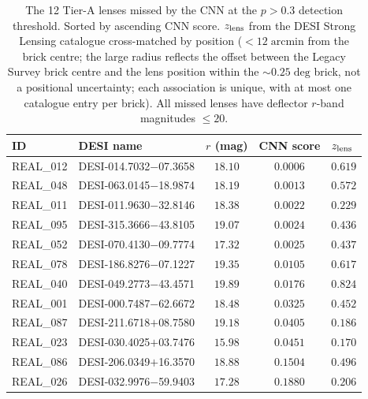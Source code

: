 \documentclass[fleqn,usenatbib]{mnras}
\begin{document}
\begin{table}
\centering
\caption{The 12 Tier-A lenses missed by the CNN at the $p > 0.3$ detection threshold.  Sorted by ascending CNN score.  $z_{\rm lens}$ from the DESI Strong Lensing catalogue cross-matched by position ($< 12\;\mathrm{arcmin}$ from the brick centre; the large radius reflects the offset between the Legacy Survey brick centre and the lens position within the $\sim\!0.25\;\mathrm{deg}$ brick, not a positional uncertainty; each association is unique, with at most one catalogue entry per brick).  All missed lenses have deflector $r$-band magnitudes $\leq 20$.}
\label{tab:missed}
\small
\setlength{\tabcolsep}{4pt}
\begin{tabular}{llccl}
\hline
ID & DESI name & $r$ (mag) & CNN score & $z_{\rm lens}$ \\
\hline
REAL\_012 & DESI-014.7032$-$07.3658 & $18.10$ & $0.0006$ & $0.619$ \\
REAL\_048 & DESI-063.0145$-$18.9874 & $18.19$ & $0.0013$ & $0.572$ \\
REAL\_011 & DESI-011.9630$-$32.8146 & $18.38$ & $0.0022$ & $0.229$ \\
REAL\_095 & DESI-315.3666$-$43.8105 & $19.07$ & $0.0024$ & $0.436$ \\
REAL\_052 & DESI-070.4130$-$09.7774 & $17.32$ & $0.0025$ & $0.437$ \\
REAL\_078 & DESI-186.8276$-$07.1227 & $19.35$ & $0.0105$ & $0.617$ \\
REAL\_040 & DESI-049.2773$-$43.4571 & $19.89$ & $0.0176$ & $0.824$ \\
REAL\_001 & DESI-000.7487$-$62.6672 & $18.48$ & $0.0325$ & $0.452$ \\
REAL\_087 & DESI-211.6718$+$08.7580 & $19.18$ & $0.0405$ & $0.186$ \\
REAL\_023 & DESI-030.4025$+$03.7476 & $15.98$ & $0.0451$ & $0.170$ \\
REAL\_086 & DESI-206.0349$+$16.3570 & $18.88$ & $0.1504$ & $0.496$ \\
REAL\_026 & DESI-032.9976$-$59.9403 & $17.28$ & $0.1880$ & $0.206$ \\
\hline
\end{tabular}
\end{table}


\bsp
\label{lastpage}
\end{document}

